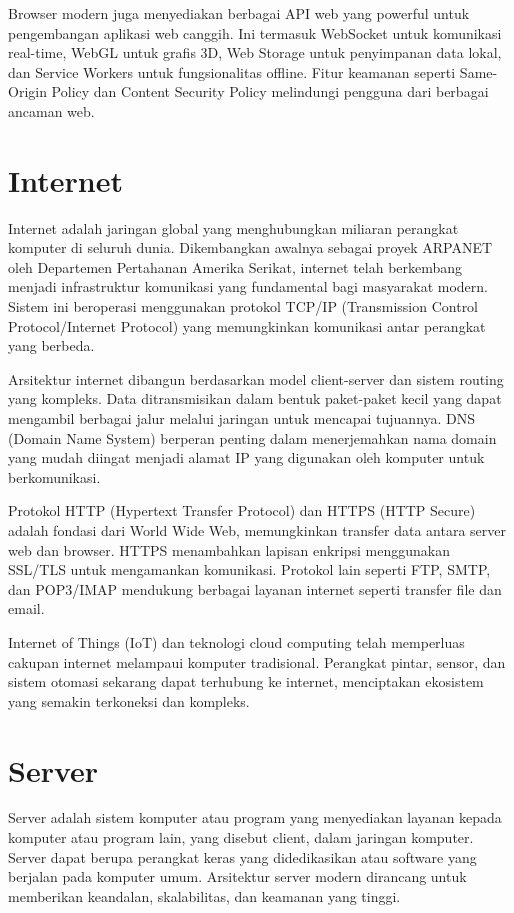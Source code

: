 \documentclass[a4paper,12pt]{report}
\begin{document}
Browser modern juga menyediakan berbagai API web yang powerful untuk pengembangan aplikasi web canggih. Ini termasuk WebSocket untuk komunikasi real-time, WebGL untuk grafis 3D, Web Storage untuk penyimpanan data lokal, dan Service Workers untuk fungsionalitas offline. Fitur keamanan seperti Same-Origin Policy dan Content Security Policy melindungi pengguna dari berbagai ancaman web.

\section{Internet}
Internet adalah jaringan global yang menghubungkan miliaran perangkat komputer di seluruh dunia. Dikembangkan awalnya sebagai proyek ARPANET oleh Departemen Pertahanan Amerika Serikat, internet telah berkembang menjadi infrastruktur komunikasi yang fundamental bagi masyarakat modern. Sistem ini beroperasi menggunakan protokol TCP/IP (Transmission Control Protocol/Internet Protocol) yang memungkinkan komunikasi antar perangkat yang berbeda.

Arsitektur internet dibangun berdasarkan model client-server dan sistem routing yang kompleks. Data ditransmisikan dalam bentuk paket-paket kecil yang dapat mengambil berbagai jalur melalui jaringan untuk mencapai tujuannya. DNS (Domain Name System) berperan penting dalam menerjemahkan nama domain yang mudah diingat menjadi alamat IP yang digunakan oleh komputer untuk berkomunikasi.

Protokol HTTP (Hypertext Transfer Protocol) dan HTTPS (HTTP Secure) adalah fondasi dari World Wide Web, memungkinkan transfer data antara server web dan browser. HTTPS menambahkan lapisan enkripsi menggunakan SSL/TLS untuk mengamankan komunikasi. Protokol lain seperti FTP, SMTP, dan POP3/IMAP mendukung berbagai layanan internet seperti transfer file dan email.

Internet of Things (IoT) dan teknologi cloud computing telah memperluas cakupan internet melampaui komputer tradisional. Perangkat pintar, sensor, dan sistem otomasi sekarang dapat terhubung ke internet, menciptakan ekosistem yang semakin terkoneksi dan kompleks.

\section{Server}
Server adalah sistem komputer atau program yang menyediakan layanan kepada komputer atau program lain, yang disebut client, dalam jaringan komputer. Server dapat berupa perangkat keras yang didedikasikan atau software yang berjalan pada komputer umum. Arsitektur server modern dirancang untuk memberikan keandalan, skalabilitas, dan keamanan yang tinggi.
\end{document}
